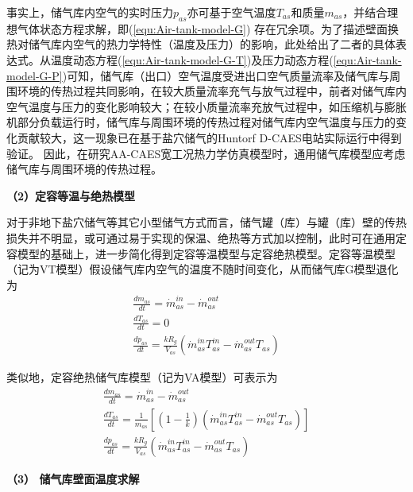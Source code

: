 事实上，储气库内空气的实时压力$p_{as}$亦可基于空气温度$T_{as}$和质量$m_{as}$，并结合理想气体状态方程求解，即(\ref{equ:Air-tank-model-G}) 存在冗余项。为了描述壁面换热对储气库内空气的热力学特性（温度及压力）的影响，此处给出了二者的具体表达式。从温度动态方程(\ref{equ:Air-tank-model-G-T})及压力动态方程(\ref{equ:Air-tank-model-G-P})可知，储气库（出口）空气温度受进出口空气质量流率及储气库与周围环境的传热过程共同影响，在较大质量流率充气与放气过程中，前者对储气库内空气温度与压力的变化影响较大；在较小质量流率充放气过程中，如压缩机与膨胀机部分负载运行时，储气库与周围环境的传热过程对储气库内空气温度与压力的变化贡献较大\cite{CAES-Wind-Rui-19}，这一现象已在基于盐穴储气的Huntorf D-CAES电站实际运行中得到验证\cite{Huntorf-20-01}。 因此，在研究AA-CAES宽工况热力学仿真模型时，通用储气库模型应考虑储气库与周围环境的传热过程。

\textbf{（2）定容等温与绝热模型}

对于非地下盐穴储气等其它小型储气方式而言，储气罐（库）与罐（库）壁的传热损失并不明显，或可通过易于实现的保温、绝热等方式加以控制，此时可在通用定容模型的基础上，进一步简化得到定容等温模型与定容绝热模型。定容等温模型（记为VT模型）假设储气库内空气的温度不随时间变化，从而储气库G模型退化为
\begin{subequations}
\label{equ:Air-tank-model-VT}
\begin{gather}
    \frac{{d{m_{as}}}}{{dt}} = \dot m_{as}^{in} - \dot m_{as}^{out}\\
    \frac{{d{T_{as}}}}{{dt}} = 0\\
    \frac{{d{p_{as}}}}{{dt}} = \frac{{k{R_g}}}{{{V_{as}}}}( {\dot m_{as}^{in}T_{as}^{in} - \dot m_{as}^{out}T_{as}^{}})
\end{gather}
\end{subequations}

类似地，定容绝热储气库模型（记为VA模型）可表示为
\begin{subequations}
\label{equ:Air-tank-model-VA}
\begin{gather}
    \frac{{d{m_{as}}}}{{dt}} = \dot m_{as}^{in} - \dot m_{as}^{out}\\
    \frac{{d{T_{as}}}}{{dt}} = \frac{1}{{{m_{as}}}}[ {({1 - \frac{1}{k}})({\dot m_{as}^{in}T_{as}^{in} - \dot m_{as}^{out}T_{as}^{}} )} ]\\
    \frac{{d{p_{as}}}}{{dt}} = \frac{{k{R_g}}}{{{V_{as}}}}({\dot m_{as}^{in}T_{as}^{in} - \dot m_{as}^{out}T_{as}^{}})
\end{gather}
\end{subequations}


\textbf{（3） 储气库壁面温度求解}

